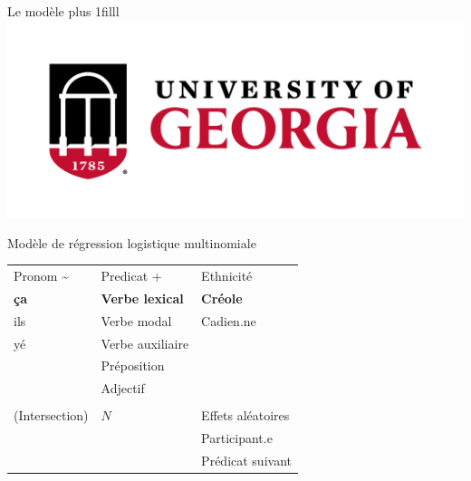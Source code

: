 \documentclass{beamer}\usepackage[]{graphicx}\usepackage[]{xcolor}
\newcommand{\Logo}{{\hskip0pt plus 1filll \includegraphics[scale=0.028]{uga_logo.png}}}
\begin{document}
\begin{frame}{Le modèle\Logo}
\footnotesize
  \begin{center}
    Modèle de régression logistique multinomiale

    \begin{tabular}{p{3cm} p{3cm} p{3cm}}
                                                                                                       &                                                                                                    & \\
      \hline
      Pronom \hfill \~{}                                                                               & Predicat \hfill +                                                                                  & Ethnicité \\
      \hline
      \textbf{ça}                                                                                      & \textbf{Verbe lexical}                                                                             & \textbf{Créole} \\
      ils                                                                                              & Verbe modal                                                                                        & Cadien.ne \\
      yé                                                                                               & Verbe auxiliaire                                                                                   & \\
                                                                                                       & Préposition                                                                                        & \\
                                                                                                       & Adjectif                                                                                           & \\
                                                                                                       & & \\
      \hline
      (Intersection)                                                                                   & $N$                                                                                                & Effets aléatoires \\
      \hline
                                                                                                       &                                                                                                    & Participant.e \\
                                                                                                       &                                                                                                    & Prédicat suivant \\
    \end{tabular}
  \end{center}
\end{frame}
  
\end{document}
